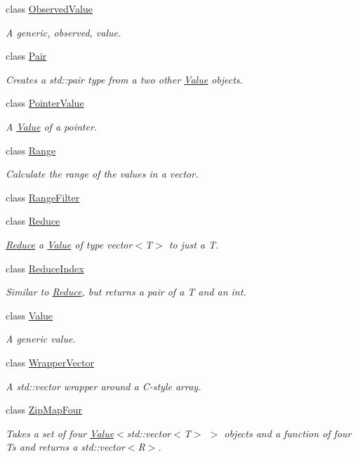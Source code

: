 \begin{DoxyCompactItemize}
class \hyperlink{classfv_1_1ObservedValue}{Observed\+Value}
\begin{DoxyCompactList}\small\item\em A generic, observed, value. \end{DoxyCompactList}\item 
class \hyperlink{classfv_1_1Pair}{Pair}
\begin{DoxyCompactList}\small\item\em Creates a std\+::pair type from a two other \hyperlink{classfv_1_1Value}{Value} objects. \end{DoxyCompactList}\item 
class \hyperlink{classfv_1_1PointerValue}{Pointer\+Value}
\begin{DoxyCompactList}\small\item\em A \hyperlink{classfv_1_1Value}{Value} of a pointer. \end{DoxyCompactList}\item 
class \hyperlink{classfv_1_1Range}{Range}
\begin{DoxyCompactList}\small\item\em Calculate the range of the values in a vector. \end{DoxyCompactList}\item 
class \hyperlink{classfv_1_1RangeFilter}{Range\+Filter}
\item 
class \hyperlink{classfv_1_1Reduce}{Reduce}
\begin{DoxyCompactList}\small\item\em \hyperlink{classfv_1_1Reduce}{Reduce} a \hyperlink{classfv_1_1Value}{Value} of type vector$<$\+T$>$ to just a T. \end{DoxyCompactList}\item 
class \hyperlink{classfv_1_1ReduceIndex}{Reduce\+Index}
\begin{DoxyCompactList}\small\item\em Similar to \hyperlink{classfv_1_1Reduce}{Reduce}, but returns a pair of a T and an int. \end{DoxyCompactList}\item 
class \hyperlink{classfv_1_1Value}{Value}
\begin{DoxyCompactList}\small\item\em A generic value. \end{DoxyCompactList}\item 
class \hyperlink{classfv_1_1WrapperVector}{Wrapper\+Vector}
\begin{DoxyCompactList}\small\item\em A std\+::vector wrapper around a C-\/style array. \end{DoxyCompactList}\item 
class \hyperlink{classfv_1_1ZipMapFour}{Zip\+Map\+Four}
\begin{DoxyCompactList}\small\item\em Takes a set of four \hyperlink{classfv_1_1Value}{Value}$<$std\+::vector$<$\+T$>$ $>$ objects and a function of four Ts and returns a std\+::vector$<$\+R$>$. \end{DoxyCompactList}\end{DoxyCompactItemize}
